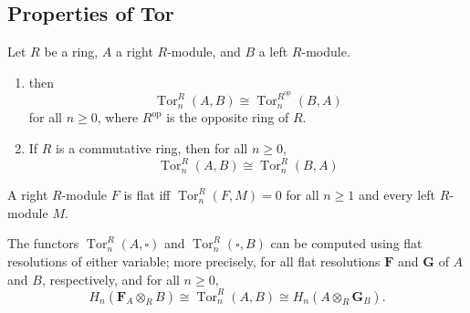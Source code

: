 \documentclass[12pt, oneside]{book}
\begin{document}
\subsection{Properties of Tor}

\begin{theorem}
    Let $R$ be a ring, $A$ a right $R$-module, and $B$ a left $R$-module.
    \begin{enumerate}
        \item
              then
              \begin{equation*}
                  \operatorname{Tor}_n^R(A, B) \cong \operatorname{Tor}_n^{R^{\mathrm{op}}}(B, A)
              \end{equation*}
              for all $n \geq 0$, where $R^{\mathrm{op}}$ is the opposite ring of $R$.
        \item
              If $R$ is a commutative ring, then for all $n \geq 0$,
              \begin{equation*}
                  \operatorname{Tor}_n^R(A, B) \cong \operatorname{Tor}_n^R(B, A)
              \end{equation*}
    \end{enumerate}
\end{theorem}


\begin{theorem}
    A right $R$-module $F$ is flat iff $\operatorname{Tor}_n^R(F, M)=0$ for all $n \geq 1$ and every left $R$-module $M$.
\end{theorem}


\begin{theorem}
    The functors $\operatorname{Tor}_n^R(A, \square)$ and $\operatorname{Tor}_n^R(\square, B)$ can be computed using flat resolutions of either variable; more precisely, for all flat resolutions $\mathbf{F}$ and $\mathbf{G}$ of $A$ and $B$, respectively, and for all $n \geq 0$,
    \begin{equation*}
        H_n\left(\mathbf{F}_A \otimes_R B\right) \cong \operatorname{Tor}_n^R(A, B) \cong H_n\left(A \otimes_R \mathbf{G}_B\right) .
    \end{equation*}
\end{theorem}
\end{document}
